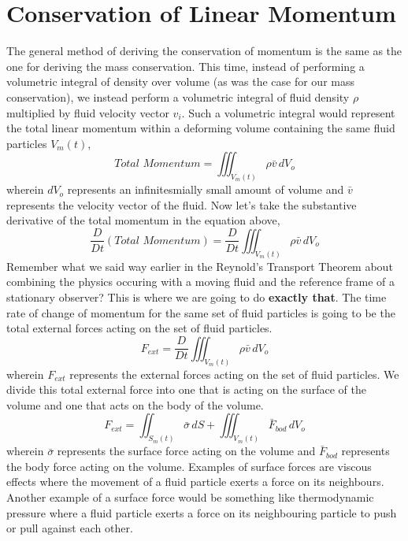 \section{Conservation of Linear Momentum}
\begin{comment}
\end{comment}
The general method of deriving the conservation of momentum is the same as the one for deriving the mass conservation.
This time, instead of performing a volumetric integral of density over volume (as was the case for our mass conservation), we instead perform a volumetric integral of fluid density $\rho$ multiplied by fluid velocity vector $v_{i}$.
Such a volumetric integral would represent the total linear momentum within a deforming volume containing the same fluid particles $V_{m}(t)$,
$$ Total \,\,Momentum = \iiint^{}_{V_{m}(t)} \rho \bar{v} \,dV_{o}$$
wherein  $dV_{o}$ represents an infinitesmially small amount of volume and $\bar{v}$ represents the velocity vector of the fluid.
Now let's take the substantive derivative of the total momentum in the equation above,
$$\frac{D}{Dt}(Total \,\,Momentum) = \frac{D}{Dt}\iiint^{}_{V_{m}(t)} \rho \bar{v} \,dV_{o}$$
Remember what we said way earlier in the Reynold's Transport Theorem about combining the physics occuring with a moving fluid and the reference frame of a stationary observer?
This is where we are going to do \textbf{exactly that}. 
The time rate of change of momentum for the same set of fluid particles is going to be the total external forces acting on the set of fluid particles.
\begin{equation}F_{ext} = \frac{D}{Dt}\iiint^{}_{V_{m}(t)} \rho \bar{v} \,dV_{o} \label{F External Momentum Equation LHS}\end{equation}
wherein $F_{ext}$ represents the external forces acting on the set of fluid particles.
We divide this total external force into one that is acting on the surface of the volume and one that acts on the body of the volume.
\begin{equation}F_{ext} = \iint^{}_{S_{m}(t)} \bar{\sigma} \,dS + \iiint^{}_{V_{m}(t)} \bar{F}_{bod} \,dV_{o} \label{F External Momentum Equation RHS}\end{equation}
wherein $\bar{\sigma}$ represents the surface force acting on the volume and $\bar{F}_{bod}$ represents the body force acting on the volume.
Examples of surface forces are viscous effects where the movement of a fluid particle exerts a force on its neighbours. 
Another example of a surface force would be something like thermodynamic pressure where a fluid particle exerts a force on its neighbouring particle to push or pull against each other.
